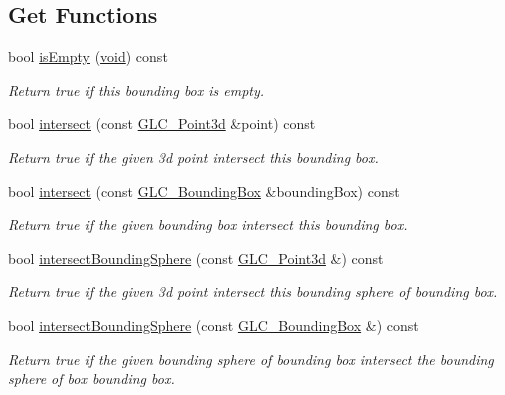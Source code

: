 \subsection*{Get Functions}
\begin{DoxyCompactItemize}
\item 
bool \hyperlink{class_g_l_c___bounding_box_a3d8c9bb70451c8c4ec964b608d0a8aa8}{is\-Empty} (\hyperlink{group___u_a_v_objects_plugin_ga444cf2ff3f0ecbe028adce838d373f5c}{void}) const 
\begin{DoxyCompactList}\small\item\em Return true if this bounding box is empty. \end{DoxyCompactList}\item 
bool \hyperlink{class_g_l_c___bounding_box_a1139f0bdf37e3880798f1a8721ae82a0}{intersect} (const \hyperlink{glc__vector3d_8h_a4e13a9bbc7ab3d34de7e98b41836772c}{G\-L\-C\-\_\-\-Point3d} \&point) const 
\begin{DoxyCompactList}\small\item\em Return true if the given 3d point intersect this bounding box. \end{DoxyCompactList}\item 
bool \hyperlink{class_g_l_c___bounding_box_abee967b7b76b5c157e41de1711f4dfe2}{intersect} (const \hyperlink{class_g_l_c___bounding_box}{G\-L\-C\-\_\-\-Bounding\-Box} \&bounding\-Box) const 
\begin{DoxyCompactList}\small\item\em Return true if the given bounding box intersect this bounding box. \end{DoxyCompactList}\item 
bool \hyperlink{class_g_l_c___bounding_box_a5b2b39f57977714851090de437401df9}{intersect\-Bounding\-Sphere} (const \hyperlink{glc__vector3d_8h_a4e13a9bbc7ab3d34de7e98b41836772c}{G\-L\-C\-\_\-\-Point3d} \&) const 
\begin{DoxyCompactList}\small\item\em Return true if the given 3d point intersect this bounding sphere of bounding box. \end{DoxyCompactList}\item 
bool \hyperlink{class_g_l_c___bounding_box_a5904d09912405432b3d13bf065bfbf42}{intersect\-Bounding\-Sphere} (const \hyperlink{class_g_l_c___bounding_box}{G\-L\-C\-\_\-\-Bounding\-Box} \&) const 
\begin{DoxyCompactList}\small\item\em Return true if the given bounding sphere of bounding box intersect the bounding sphere of box bounding box. \end{DoxyCompactList}\item 

\end{DoxyCompactItemize}
